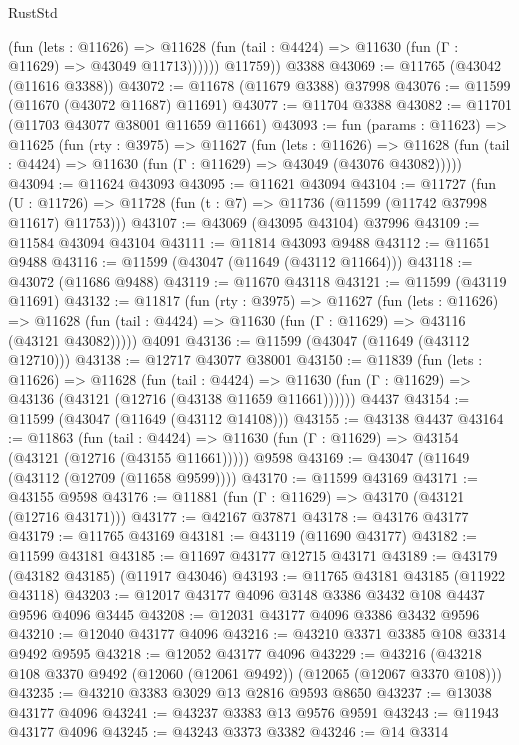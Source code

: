 \begin{lexlean}{RustStd}
\begin{coremodule}
              (fun (lets : @11626) =>
              @11628 (fun (tail : @4424) => @11630 (fun (Γ : @11629) => @43049 @11713))))))
        @11759))
    @3388
@43069 := @11765 (@43042 (@11616 @3388))
@43072 := @11678 (@11679 @3388) @37998
@43076 := @11599 (@11670 (@43072 @11687) @11691)
@43077 := @11704 @3388
@43082 := @11701 (@11703 @43077 @38001 @11659 @11661)
@43093 := fun (params : @11623) =>
  @11625
    (fun (rty : @3975) =>
    @11627
      (fun (lets : @11626) =>
      @11628 (fun (tail : @4424) => @11630 (fun (Γ : @11629) => @43049 (@43076 @43082)))))
@43094 := @11624 @43093
@43095 := @11621 @43094
@43104 := @11727
    (fun (U : @11726) => @11728 (fun (t : @7) => @11736 (@11599 (@11742 @37998 @11617) @11753)))
@43107 := @43069 (@43095 @43104) @37996
@43109 := @11584 @43094 @43104
@43111 := @11814 @43093 @9488
@43112 := @11651 @9488
@43116 := @11599 (@43047 (@11649 (@43112 @11664)))
@43118 := @43072 (@11686 @9488)
@43119 := @11670 @43118
@43121 := @11599 (@43119 @11691)
@43132 := @11817
    (fun (rty : @3975) =>
    @11627
      (fun (lets : @11626) =>
      @11628 (fun (tail : @4424) => @11630 (fun (Γ : @11629) => @43116 (@43121 @43082)))))
    @4091
@43136 := @11599 (@43047 (@11649 (@43112 @12710)))
@43138 := @12717 @43077 @38001
@43150 := @11839
    (fun (lets : @11626) =>
    @11628
      (fun (tail : @4424) =>
      @11630 (fun (Γ : @11629) => @43136 (@43121 (@12716 (@43138 @11659 @11661))))))
    @4437
@43154 := @11599 (@43047 (@11649 (@43112 @14108)))
@43155 := @43138 @4437
@43164 := @11863
    (fun (tail : @4424) => @11630 (fun (Γ : @11629) => @43154 (@43121 (@12716 (@43155 @11661)))))
    @9598
@43169 := @43047 (@11649 (@43112 (@12709 (@11658 @9599))))
@43170 := @11599 @43169
@43171 := @43155 @9598
@43176 := @11881 (fun (Γ : @11629) => @43170 (@43121 (@12716 @43171)))
@43177 := @42167 @37871
@43178 := @43176 @43177
@43179 := @11765 @43169
@43181 := @43119 (@11690 @43177)
@43182 := @11599 @43181
@43185 := @11697 @43177 @12715 @43171
@43189 := @43179 (@43182 @43185) (@11917 @43046)
@43193 := @11765 @43181 @43185 (@11922 @43118)
@43203 := @12017 @43177 @4096 @3148 @3386 @3432 @108 @4437 @9596 @4096 @3445
@43208 := @12031 @43177 @4096 @3386 @3432 @9596
@43210 := @12040 @43177 @4096
@43216 := @43210 @3371 @3385 @108 @3314 @9492 @9595
@43218 := @12052 @43177 @4096
@43229 := @43216 (@43218 @108 @3370 @9492 (@12060 (@12061 @9492)) (@12065 (@12067 @3370 @108)))
@43235 := @43210 @3383 @3029 @13 @2816 @9593 @8650
@43237 := @13038 @43177 @4096
@43241 := @43237 @3383 @13 @9576 @9591
@43243 := @11943 @43177 @4096
@43245 := @43243 @3373 @3382
@43246 := @14 @3314

\end{coremodule}
\end{lexlean}
